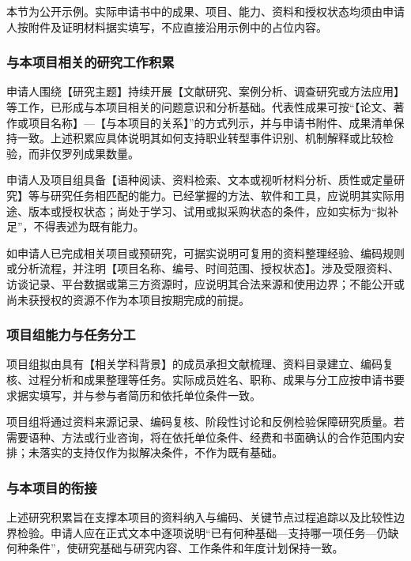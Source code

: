 \justifying
\NSFCBodyText

本节为公开示例。实际申请书中的成果、项目、能力、资料和授权状态均须由申请人按附件及证明材料据实填写，不应直接沿用示例中的占位内容。

\subsubsection{与本项目相关的研究工作积累}

申请人围绕【研究主题】持续开展【文献研究、案例分析、调查研究或方法应用】等工作，已形成与本项目相关的问题意识和分析基础。代表性成果可按“【论文、著作或项目名称】---【与本项目的关系】”的方式列示，并与申请书附件、成果清单保持一致。上述积累应具体说明其如何支持职业转型事件识别、机制解释或比较检验，而非仅罗列成果数量。

申请人及项目组具备【语种阅读、资料检索、文本或视听材料分析、质性或定量研究】等与研究任务相匹配的能力。已经掌握的方法、软件和工具，应说明其实际用途、版本或授权状态；尚处于学习、试用或拟采购状态的条件，应如实标为“拟补足”，不得表述为既有能力。

如申请人已完成相关项目或预研究，可据实说明可复用的资料整理经验、编码规则或分析流程，并注明【项目名称、编号、时间范围、授权状态】。涉及受限资料、访谈记录、平台数据或第三方资源时，应说明其合法来源和使用边界；不能公开或尚未获授权的资源不作为本项目按期完成的前提。

\subsubsection{项目组能力与任务分工}

项目组拟由具有【相关学科背景】的成员承担文献梳理、资料目录建立、编码复核、过程分析和成果整理等任务。实际成员姓名、职称、成果与分工应按申请书要求据实填写，并与参与者简历和依托单位条件一致。

项目组将通过资料来源记录、编码复核、阶段性讨论和反例检验保障研究质量。若需要语种、方法或行业咨询，将在依托单位条件、经费和书面确认的合作范围内安排；未落实的支持仅作为拟解决条件，不作为既有基础。

\subsubsection{与本项目的衔接}
上述研究积累旨在支撑本项目的资料纳入与编码、关键节点过程追踪以及比较性边界检验。申请人应在正式文本中逐项说明“已有何种基础---支持哪一项任务---仍缺何种条件”，使研究基础与研究内容、工作条件和年度计划保持一致。
